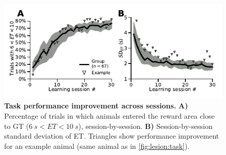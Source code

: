 \begin{figure}[h!]
	\begin{center}
		\includegraphics[scale=1]{ch-appendicies/figures/CorrectTrialCurve.pdf}
		\caption
		{\textbf{Task performance improvement across sessions.}
		\textbf{A)} Percentage of trials in which animals entered the reward area close to GT ($6~s<ET<10~s$), session-by-session.
		\textbf{B)} Session-by-session standard deviation of ET.
		Triangles show performance improvement for an example animal (same animal as in \autoref{fig:lesion:task}).
		}
		\label{fig:appendix:CorrectTrialCurve}
	\end{center}
\end{figure}